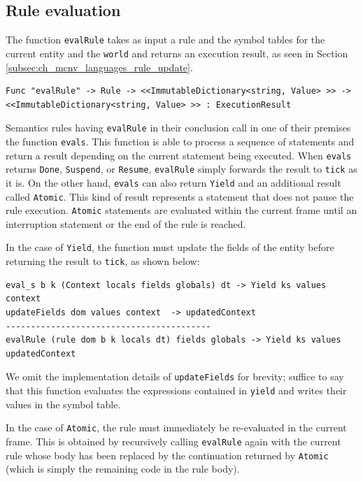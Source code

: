 \subsection{Rule evaluation}
\label{subsec:ch_mcnv_languages_rule_evaluation}

The function \texttt{evalRule} takes as input a rule and the symbol tables for the current entity and the \texttt{world} and returns an execution result, as seen in Section \ref{subsec:ch_mcnv_languages_rule_update}.

\begin{lstlisting}
Func "evalRule" -> Rule -> <<ImmutableDictionary<string, Value> >> -> <<ImmutableDictionary<string, Value> >> : ExecutionResult
\end{lstlisting}

\noindent
Semantics rules having \texttt{evalRule} in their conclusion call in one of their premises the function \texttt{eval\tu s}. This function is able to process a sequence of statements and return a result depending on the current statement being executed. When \texttt{eval\tu s} returns \texttt{Done}, \texttt{Suspend}, or \texttt{Resume}, \texttt{evalRule} simply forwards the result to \texttt{tick} as it is. On the other hand, \texttt{eval\tu s} can also return \texttt{Yield} and an additional result called \texttt{Atomic}. This kind of result represents a statement that does not pause the rule execution. \texttt{Atomic} statements are evaluated within the current frame until an interruption statement or the end of the rule is reached.

In the case of \texttt{Yield}, the function must update the fields of the entity before returning the result to \texttt{tick}, as shown below:

\begin{lstlisting}
eval_s b k (Context locals fields globals) dt -> Yield ks values context
updateFields dom values context  -> updatedContext
-----------------------------------------
evalRule (rule dom b k locals dt) fields globals -> Yield ks values updatedContext
\end{lstlisting}

\noindent
We omit the implementation details of \texttt{updateFields} for brevity; suffice to say that this function evaluates the expressions contained in \texttt{yield} and writes their values in the symbol table.

In the case of \texttt{Atomic}, the rule must immediately be re-evaluated in the current frame. This is obtained by recursively calling \texttt{evalRule} again with the current rule whose body has been replaced by the continuation returned by \texttt{Atomic} (which is simply the remaining code in the rule body).

